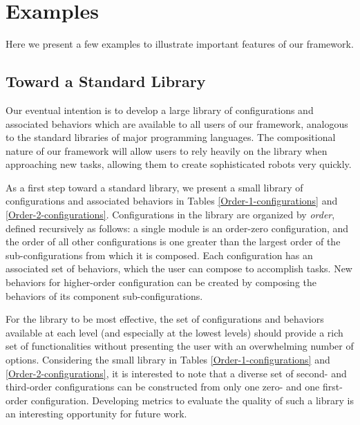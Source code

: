 \documentclass[conference]{IEEEtran}
\theoremstyle{definition}
\begin{document}
\section{Examples}
\label{sec:examples}
Here we present a few examples to illustrate important features of our framework.
\subsection{Toward a Standard Library}
Our eventual intention is to develop a large library of configurations and associated
behaviors which are available to all users of our framework, analogous to the standard
libraries of major programming languages.  The compositional nature of our framework
will allow users to rely heavily on the library when approaching new tasks, allowing
them to create sophisticated robots very quickly.

As a first step toward a standard library, we present a small library of configurations
and associated behaviors in Tables \ref{Order-1-configurations} and \ref{Order-2-configurations}.
Configurations in the library are organized by \textit{order}, defined recursively
as follows: a single module is an order-zero configuration, and the order of all
other configurations is one greater than the largest order of the sub-configurations
from which it is composed. Each configuration has an associated set of behaviors,
which the user can compose to accomplish tasks.  New behaviors for higher-order configuration can be created by composing the behaviors of its component sub-configurations.

For the library to be most effective, the set of configurations and behaviors available
 at each level (and especially at the lowest levels) should provide a rich set of
 functionalities without presenting the user with an overwhelming number of options. 
 Considering the small library in Tables \ref{Order-1-configurations} and \ref{Order-2-configurations},
 it is interested to note that a diverse set of second- and third-order configurations can
be constructed from only one zero- and one first-order configuration. Developing metrics to
evaluate the quality of such a library is an interesting opportunity for future work. 
\end{document}
